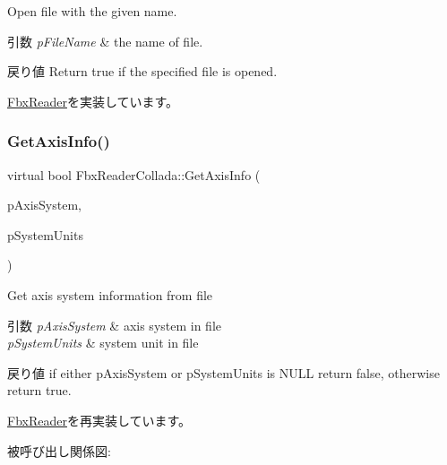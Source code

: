 Open file with the given name. 
\begin{DoxyParams}{引数}
{\em p\+File\+Name} & the name of file. \\
\hline
\end{DoxyParams}
\begin{DoxyReturn}{戻り値}
Return true if the specified file is opened. 
\end{DoxyReturn}


\hyperlink{class_fbx_reader_a6105bd37ae86c03f35aee6f62901856d}{Fbx\+Reader}を実装しています。

\mbox{\label{class_fbx_reader_collada_aed6cb43bb8262e63260088ad8abcf2e6}} 
\subsubsection{\texorpdfstring{Get\+Axis\+Info()}{GetAxisInfo()}}
{\footnotesize\ttfamily virtual bool Fbx\+Reader\+Collada\+::\+Get\+Axis\+Info (\begin{DoxyParamCaption}\item[{\hyperlink{class_fbx_axis_system}{Fbx\+Axis\+System} $\ast$}]{p\+Axis\+System,  }\item[{\hyperlink{class_fbx_system_unit}{Fbx\+System\+Unit} $\ast$}]{p\+System\+Units }\end{DoxyParamCaption})\hspace{0.3cm}{\ttfamily [virtual]}}

Get axis system information from file 
\begin{DoxyParams}{引数}
{\em p\+Axis\+System} & axis system in file \\
\hline
{\em p\+System\+Units} & system unit in file \\
\hline
\end{DoxyParams}
\begin{DoxyReturn}{戻り値}
if either p\+Axis\+System or p\+System\+Units is {\ttfamily N\+U\+LL} return {\ttfamily false}, otherwise return {\ttfamily true}. 
\end{DoxyReturn}


\hyperlink{class_fbx_reader_a73e58c3f7734250f0f8ffaef96b2df3f}{Fbx\+Reader}を再実装しています。

被呼び出し関係図\+:
\mbox{\label{class_fbx_reader_collada_a23cea871d527b8695ebdeade47b1938e}} 
